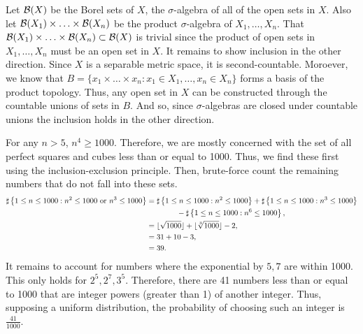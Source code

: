 \begin{problem}{12}
\end{problem}
\begin{solution}
    Let $\mathcal{B}(X)$ be the Borel sets of $X$, the $\sigma$-algebra of all of the open sets in $X$. Also let $\mathcal{B}(X_1) \times \ldots \times \mathcal{B}(X_n)$ be the product $\sigma$-algebra of $X_1,\ldots,X_n$. That $\mathcal{B}(X_1) \times \ldots \times \mathcal{B}(X_n) \subset \mathcal{B}(X)$ is trivial since the product of open sets in $X_1, \ldots, X_n$ must be an open set in $X$. It remains to show inclusion in the other direction. Since $X$ is a separable metric space, it is second-countable. Moroever, we know that $B = \{x_1 \times \ldots \times x_n : x_1 \in X_1,\ldots,x_n \in X_n\}$ forms a basis of the product topology. Thus, any open set in $X$ can be constructed through the countable unions of sets in $B$. And so, since $\sigma$-algebras are closed under countable unions the inclusion holds in the other direction.
\end{solution}
\begin{problem}{13}
\end{problem}
\begin{solution}
    For any $n > 5$, $n^4 \geq 1000$. Therefore, we are mostly concerned with the set of all perfect squares and cubes less than or equal to 1000. Thus, we find these first using the inclusion-exclusion principle. Then, brute-force count the remaining numbers that do not fall into these sets. 
    \begin{align*}
        \sharp\left\{ 1 \leq n \leq 1000: n^2 \leq 1000~\text{or}~n^3 \leq 1000 \right\} &= \sharp \left\{ 1 \leq n \leq 1000: n^2 \leq 1000 \right\} + \sharp \left\{ 1 \leq n \leq 1000: n^3 \leq 1000 \right\} \\ &\qquad\qquad - \sharp\left\{ 1 \leq n \leq 1000: n^6 \leq 1000 \right\}, \\
        &= \lfloor \sqrt{1000} \rfloor + \lfloor \sqrt[3]{1000} \rfloor - 2, \\
        &= 31 + 10 - 3, \\
        &= 39.
    \end{align*}
    It remains to account for numbers where the exponential by $5,7$ are within 1000. This only holds for $2^5,2^7,3^5$. Therefore, there are 41 numbers less than or equal to 1000 that are integer powers (greater than 1) of another integer. Thus, supposing a uniform distribution, the probability of choosing such an integer is $\frac{41}{1000}$.
\end{solution}
\begin{problem}{14}    
\end{problem}
